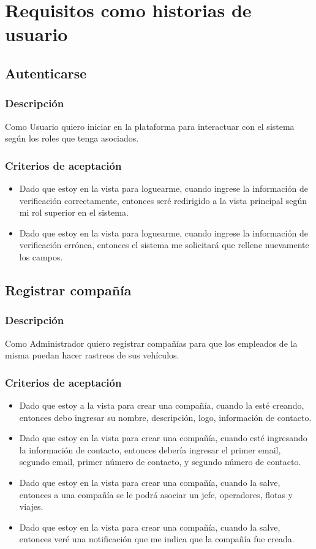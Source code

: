 \documentclass{article}
\begin{document}
\section{Requisitos como historias de usuario}

\subsection{Autenticarse}
\subsubsection{Descripción}
Como Usuario quiero iniciar en la plataforma para interactuar con el sistema según los roles que tenga asociados.
\subsubsection{Criterios de aceptación}
\begin{itemize}
    \item Dado que estoy en la vista para loguearme, cuando ingrese la información de verificación correctamente, entonces seré redirigido a la vista principal según mi rol superior en el sistema.
    \item Dado que estoy en la vista para loguearme, cuando ingrese la información de verificación errónea, entonces el sistema me solicitará que rellene nuevamente los campos.
\end{itemize}

\subsection{Registrar compañía}
\subsubsection{Descripción} 
Como Administrador quiero registrar compañías para que los empleados de la misma puedan hacer rastreos de sus vehículos.
\subsubsection{Criterios de aceptación} 
\begin{itemize}
    \item Dado que estoy a la vista para crear una compañía, cuando la esté creando, entonces debo ingresar su nombre, descripción, logo, información de contacto.
    \item Dado que estoy en la vista para crear una compañía, cuando esté ingresando la información de contacto, entonces debería ingresar el primer email, segundo email, primer número de contacto, y segundo número de contacto.
    \item Dado que estoy en la vista para crear una compañía, cuando la salve, entonces a una compañía se le podrá asociar un jefe, operadores, flotas y viajes.
    \item Dado que estoy en la vista para crear una compañía, cuando la salve, entonces veré una notificación que me indica que la compañía fue creada.
\end{itemize}
\end{document}
